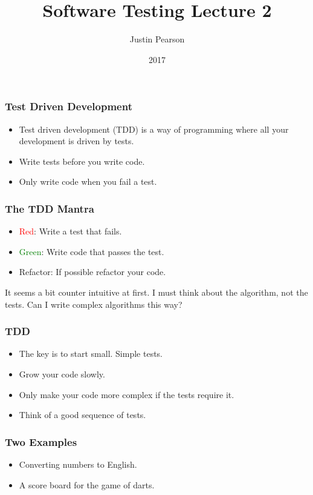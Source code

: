 \documentclass{beamer}
\title{Software Testing Lecture 2}
\author{Justin Pearson}
\date{2017}
\begin{document}
\begin{frame}
  \maketitle
\end{frame}
\begin{frame}
\frametitle{Test Driven Development}
\begin{itemize}
\item Test driven development (TDD) is a way of programming where all
  your development is driven by tests.
\item Write tests before you write code. 
\item Only write code when you fail a test. 
\end{itemize}
  \end{frame}
\begin{frame}
\frametitle{The TDD Mantra}
\begin{itemize}
\item \textcolor{red}{Red}: Write a test that fails.
\item \textcolor{green}{Green}: Write code that passes the test.
\item Refactor: If possible refactor your code.
\end{itemize}
It seems a bit counter intuitive at first. I must think about the
algorithm, not the tests. Can I write complex algorithms this way?  
\end{frame}
\begin{frame}
  \frametitle{TDD}
  \begin{itemize}
  \item The key is to start small. Simple tests.
  \item Grow your code slowly. 
  \item Only make your code more complex if the tests require it.
  \item Think of a good sequence of tests.
  \end{itemize}
\end{frame}
\begin{frame}
  \frametitle{Two Examples}
  \begin{itemize}
  \item Converting numbers to English.
  \item A score board for the game of darts.
  \end{itemize}
\end{frame}
\end{document}

